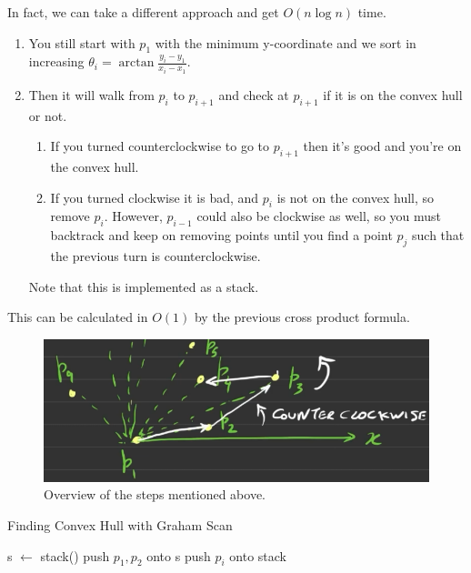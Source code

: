\documentclass{article}
\begin{document}
  \begin{example}
    In fact, we can take a different approach and get $O(n \log{n})$ time. 
    \begin{enumerate}
      \item You still start with $p_1$ with the minimum y-coordinate and we sort in increasing $\theta_i = \arctan \frac{y_i - y_1}{x_i - x_1}$. 
      \item Then it will walk from $p_i$ to $p_{i+1}$ and check at $p_{i+1}$ if it is on the convex hull or not. 
        \begin{enumerate}
          \item If you turned counterclockwise to go to $p_{i+1}$ then it's good and you're on the convex hull. 
          \item If you turned clockwise it is bad, and $p_i$ is not on the convex hull, so remove $p_i$. However, $p_{i-1}$ could also be clockwise as well, so you must backtrack and keep on removing points until you find a point $p_j$ such that the previous turn is counterclockwise. 
        \end{enumerate}
        Note that this is implemented as a stack. 
    \end{enumerate}
    This can be calculated in $O(1)$ by the previous cross product formula. 
    \begin{figure}[H]
      \centering 
      \includegraphics[scale=0.4]{img/graham.png}
      \caption{Overview of the steps mentioned above. } 
      \label{fig:graham}
    \end{figure}
    \begin{algorithm}[H]
      \caption{Finding Convex Hull with Graham Scan}
      \label{alg:graham}
      \begin{algorithmic}
          \State s $\gets$ stack()
          \State push $p_1, p_2$ onto s 
            \State push $p_i$ onto stack 

\end{algorithmic}
\end{algorithm}
\end{example}
\end{document}
